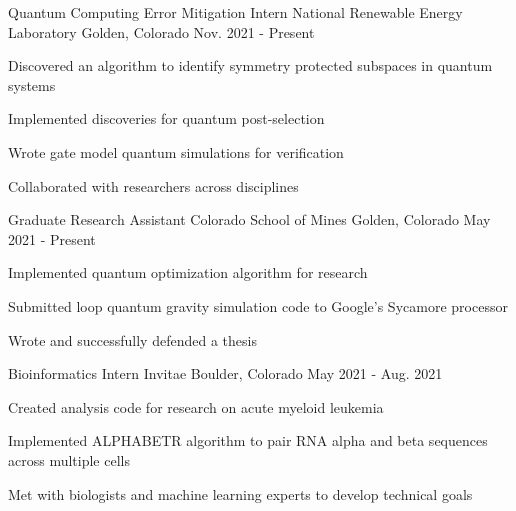 

\begin{cventries}

  \cventry
    {Quantum Computing Error Mitigation Intern}
    {National Renewable Energy Laboratory}
    {Golden, Colorado}
    {Nov. 2021 - Present}
    {
      \begin{cvitems}
        \item {Discovered an algorithm to identify symmetry protected subspaces in quantum systems}
        \item {Implemented discoveries for quantum post-selection}
        \item {Wrote gate model quantum simulations for verification}
        \item {Collaborated with researchers across disciplines}
      \end{cvitems}
    }

  \cventry
    {Graduate Research Assistant}
    {Colorado School of Mines}
    {Golden, Colorado}
    {May 2021 - Present}
    {
      \begin{cvitems}
        \item {Implemented quantum optimization algorithm for research}
        \item {Submitted loop quantum gravity simulation code to Google's Sycamore processor}
        \item {Wrote and successfully defended a thesis}
      \end{cvitems}
    }

  \cventry
    {Bioinformatics Intern}
    {Invitae}
    {Boulder, Colorado}
    {May 2021 - Aug. 2021}
    {
      \begin{cvitems}
        \item {Created analysis code for research on acute myeloid leukemia}
        \item {Implemented ALPHABETR algorithm to pair RNA alpha and beta sequences across multiple cells}
        \item {Met with biologists and machine learning experts to develop technical goals}
      \end{cvitems}
    }
    

\end{cventries}
